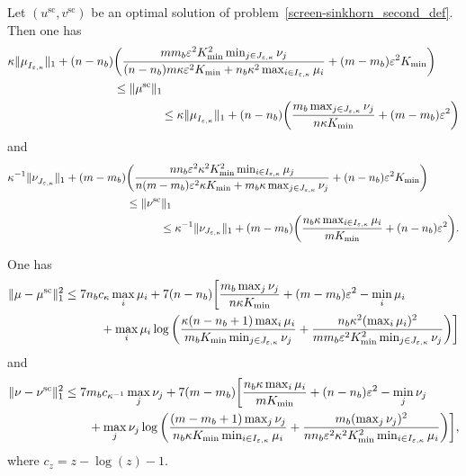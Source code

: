 \begin{lemma}
\label{lemma_bounds_on_marginals}
Let $(u^{\text{sc}}, v^{\text{sc}})$ be an optimal solution of problem~\eqref{screen-sinkhorn_second_def}.
Then one has 
\begin{align*}
 \kappa \|\mu_{I_{\varepsilon,\kappa}}^{\text{}}\|_1  + (n -n_b) &\bigg(\frac{mm_b\varepsilon^2 K_{\min}^2 \min_{j\in J_{\varepsilon, \kappa}} \nu_j}{ (n-n_b)m\kappa \varepsilon^2 K_{\min} + n_b\kappa^2 \max_{i\in I_{\varepsilon,\kappa}}\mu_i } + (m-m_b)\varepsilon^2K_{\min}\bigg)\\
 & \leq \|\mu^{\text{sc}}\|_1\\
 & \qquad \qquad \leq \kappa \|\mu_{I_{\varepsilon,\kappa}}^{\text{}}\|_1 + (n-n_b) \bigg(\frac{m_b\max_{j \in J_{\varepsilon,\kappa}} \nu_j}{n\kappa K_{\min}} + (m-m_b)\varepsilon^2 \bigg)
\end{align*}
and 
\begin{align*}
\kappa^{-1} \|\nu_{J_{\varepsilon,\kappa}}^{\text{}}\|_1 + (m -m_b) &\bigg(\frac{nn_b\varepsilon^2\kappa^2K_{\min}^2 \min_{i\in I_{\varepsilon, \kappa}} \mu_j}{ n(m-m_b)\varepsilon^2 \kappa K_{\min} + m_b\kappa \max_{j\in J_{\varepsilon,\kappa}}\nu_j } + (n-n_b)\varepsilon^2K_{\min}\bigg)\\
&\leq \|\nu^{\text{sc}}\|_1\\
 & \qquad \quad \leq \kappa^{-1} \|\nu_{J_{\varepsilon,\kappa}}\|_1 + (m-m_b)\bigg(\frac{n_b\kappa \max_{i\in I_{\varepsilon,\kappa}}\mu_i}{m K_{\min}} + (n-n_b)\varepsilon^2\bigg).
\end{align*}
\end{lemma}
\begin{proposition}
\label{proposition_error_in_marginals}
One has %
\begin{align}
\label{maginal_mu}
{\|{\mu} -{\mu}^{\text{sc}}\|^2_1}&\leq 7 n_bc_\kappa \max_{i} \mu_i + 7 (n-n_b)\bigg[\frac{m_b\max_{j}\nu_j}{n\kappa K_{\min}} + (m- m_b) \varepsilon^2 - \min_{i}\mu_i \nonumber\\
&\qquad \quad  + \max_{i} \mu_i\log\bigg(\frac{\kappa(n-n_b+ 1)\max_{i} \mu_i}{m_b K_{\min}\min_{j \in J_{\varepsilon,\kappa}}\nu_j} + \frac{n_b\kappa^2(\max_{i} \mu_i)^2}{mm_b\varepsilon^2K_{\min}^2\min_{j \in J_{\varepsilon,\kappa}}\nu_j}\bigg)\bigg]
\end{align}
and 
\begin{align}
\label{maginal_nu}
{\|{\nu} -{\nu}^{\text{sc}}\|^2_1} &\leq 7 m_bc_{\kappa^{-1}}\max_{j} \nu_j + 7(m-m_b)\bigg[\frac{n_b\kappa\max_{i}\mu_i}{m K_{\min}} + (n- n_b) \varepsilon^2 - \min_{j}\nu_j\nonumber\\ 
&\qquad  + \max_{j} \nu_j\log\bigg(\frac{(m-m_b+ 1)\max_{j} \nu_j}{n_b \kappa K_{\min}\min_{i \in I_{\varepsilon,\kappa}}\mu_i} + \frac{m_b(\max_{j} \nu_j)^2}{nn_b\varepsilon^2\kappa^2K_{\min}^2\min_{i \in I_{\varepsilon,\kappa}}\mu_i}\bigg)\bigg],
\end{align}
where $c_z = z-\log(z)-1.$
\end{proposition}
